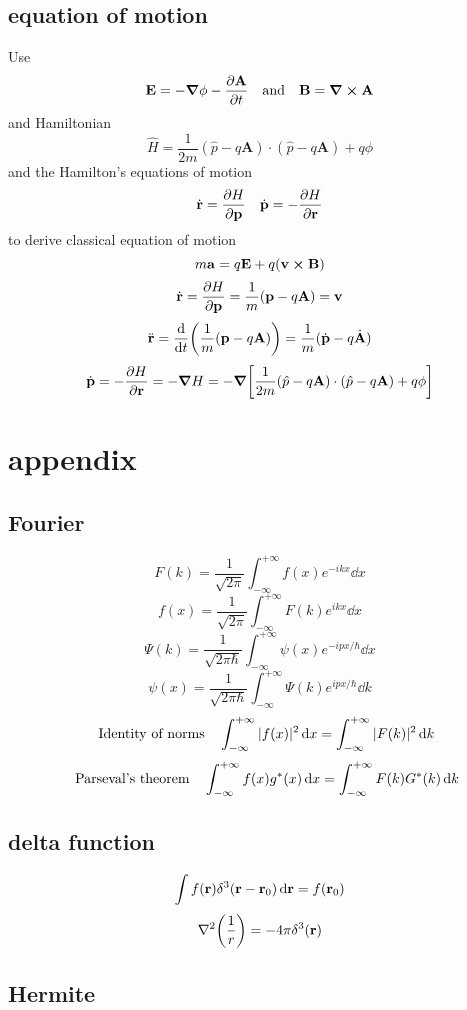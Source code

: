 \documentclass[12pt]{article}
\begin{document}
\subsection*{equation of motion}
Use \[\vb{E}=-\grad{\phi}-\pdv{\vb{A}}{t}\qq{and}\vb{B}=\curl{\vb{A}}\]
and Hamiltonian \[\hat{H}=\frac{1}{2m}(\hat{p}-q\mathbf{A})\cdot(\hat{p}-q\mathbf{A})+ q\phi\]
and the Hamilton's equations of motion \[\dot{\vb{r}}=\pdv{H}{\vb{p}}\quad\dot{\vb{p}}=-\pdv{H}{\vb{r}}\]
to derive classical equation of motion \[m\vb{a}=q\vb{E}+q(\vb{v}\cp\vb{B})\]
\[\dot{\vb{r}}=\pdv{H}{\vb{p}}=\frac{1}{m}(\vb{p}-q\vb{A})=\vb{v}\]
\[\ddot{\vb{r}}=\dv{t}\qty(\frac{1}{m}(\vb{p}-q\vb{A}))=\frac{1}{m}(\dot{\vb{p}}-q\dot{\vb{A}})\]
\[\dot{\vb{p}}=-\pdv{H}{\vb{r}}=-\grad{H}=-\grad{\qty[\frac{1}{2m}(\hat{p}-q\mathbf{A})\cdot(\hat{p}-q\mathbf{A})+ q\phi]}\]
\section*{appendix}
\subsection*{Fourier}
\[F(k)=\frac{1}{\sqrt{2\pi}}\int_{-\infty}^{+\infty}f(x)e^{-ikx}\dd{x}\]
\[f(x)=\frac{1}{\sqrt{2\pi}}\int_{-\infty}^{+\infty}F(k)e^{ikx}\dd{x}\]
\[\Psi(k)=\frac{1}{\sqrt{2\pi\hbar}}\int_{-\infty}^{+\infty}\psi(x)e^{-ipx/\hbar}\dd{x}\]
\[\psi(x)=\frac{1}{\sqrt{2\pi\hbar}}\int_{-\infty}^{+\infty}\Psi(k)e^{ipx/\hbar}\dd{k}\]
\[\qq{Identity of norms} \int_{-\infty}^{+\infty}|f(x)|^2\dd{x}=\int_{-\infty}^{+\infty}|F(k)|^2\dd{k}\]
\[\qq{Parseval's theorem} \int_{-\infty}^{+\infty}f(x)g^*(x)\dd{x}=\int_{-\infty}^{+\infty}F(k)G^*(k)\dd{k}\]
\subsection*{delta function}
\[\int f(\vb{r})\delta^3(\vb{r}-\vb{r}_0)\dd{\vb{r}}=f(\vb{r}_0)\]
\[\laplacian{\qty(\frac{1}{r})}=-4\pi\delta^3(\vb{r})\]
\subsection*{Hermite}
\end{document}
